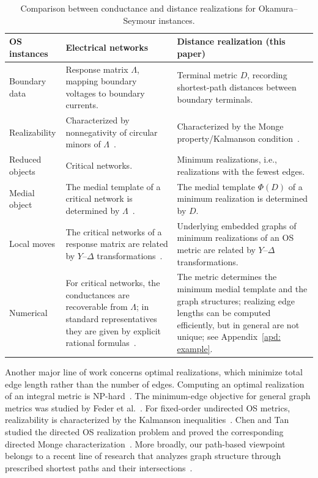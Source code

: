\documentclass[11pt]{article}
\begin{document}
\begin{table}[h]
\centering
\renewcommand{\arraystretch}{1.25}
\begin{tabular}{p{}p{}p{}}
\hline
\textbf{OS instances} & \textbf{Electrical networks} & \textbf{Distance realization (this paper)} \\
\hline
Boundary data & Response matrix $\Lambda$, mapping boundary voltages to boundary currents. & Terminal metric $D$, recording shortest-path distances between boundary terminals. \\
Realizability & Characterized by nonnegativity of circular minors of $\Lambda$~\cite{curtis1998}. & Characterized by the Monge property/Kalmanson condition~\cite{hurkens1988tidy,ChangO20}. \\
Reduced objects & Critical networks. & Minimum realizations, i.e., realizations with the fewest edges. \\
Medial object & The medial template of a critical network is determined by $\Lambda$~\cite{de1996,curtis1998}. & The medial template $\Phi(D)$ of a minimum realization is determined by $D$. \\
Local moves & The critical networks of a response matrix are related by $Y$--$\Delta$ transformations~\cite{de1996,curtis1998}. & Underlying embedded graphs of minimum realizations of an OS metric are related by $Y$--$\Delta$ transformations. \\
Numerical & For critical networks, the conductances are recoverable from $\Lambda$; in standard representatives they are given by explicit rational formulas~\cite{kenyon2008,kenyon2011}. & The metric determines the minimum medial template and the graph structures; realizing edge lengths can be computed efficiently, but in general are not unique; see Appendix~\ref{apd: example}. \\
\hline
\end{tabular}
\caption{Comparison between conductance and distance realizations for Okamura--Seymour instances.}\label{table}
\end{table}

Another major line of work concerns optimal realizations, which minimize total edge length rather than the number of edges. Computing an optimal realization of an integral metric is NP-hard~\cite{Althoefer88,Winkler88}. The minimum-edge objective for general graph metrics was studied by Feder et al.~\cite{feder2003representing}. For fixed-order undirected OS metrics, realizability is characterized by the Kalmanson inequalities~\cite{hurkens1988tidy,ChangO20}. Chen and Tan studied the directed OS realization problem and proved the corresponding directed Monge characterization~\cite{chen2025path}. More broadly, our path-based viewpoint belongs to a recent line of research that analyzes graph structure through prescribed shortest paths and their intersections~\cite{bodwin2019structure,akmal2022local,cizma2022geodesic,cizma2023irreducible,chen2025path,li2025paths}.
\end{document}
